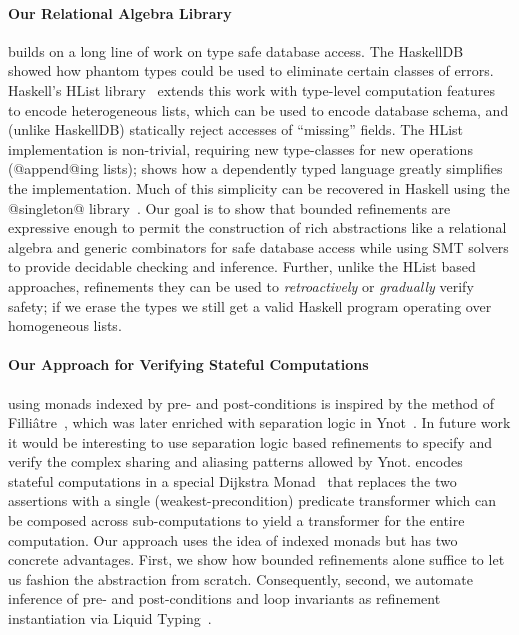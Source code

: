 \paragraph{Our Relational Algebra Library} builds on a long
line of work on type safe database access.
%
The HaskellDB~\citep{haskellDB}
showed how phantom types could be used to eliminate
certain classes of errors.
%
Haskell's HList library~\citep{heterogeneous}
extends this work with type-level computation
features to encode heterogeneous lists, which
can be used to encode database schema, and
(unlike HaskellDB) statically reject accesses
of ``missing'' fields.
%
The HList implementation is non-trivial,
requiring new type-classes for new operations
(\eg @append@ing lists); \citep{thepipower}
shows how a dependently typed language greatly
simplifies the implementation.
%
Much of this simplicity can be recovered in
Haskell using the @singleton@ library~\citep{Weirich12}.
%
Our goal is to show that bounded refinements
are expressive enough to permit the construction
of rich abstractions like a relational algebra
and generic combinators for safe database access
while using SMT solvers to provide decidable
checking and inference. Further, unlike the
HList based approaches, refinements they can
be used to \emph{retroactively} or \emph{gradually}
verify safety; if we erase the types we still
get a valid Haskell program operating over
homogeneous lists.


\paragraph{Our Approach for Verifying Stateful Computations} using monads
indexed by pre- and post-conditions is inspired by the method of
Filli\^atre~\citep{Filliatre98}, which was later enriched with
separation logic in Ynot~\citep{ynot}. In future work it would
be interesting to use separation logic based refinements to specify
and verify the complex sharing and aliasing patterns allowed by Ynot.
%
\fstar encodes stateful computations in a special Dijkstra
Monad~\citep{dijkstramonad} that replaces the two assertions with
a single (weakest-precondition) predicate transformer which
can be composed across sub-computations to yield a transformer
for the entire computation.
%
Our \RIO approach uses the idea of indexed monads but
has two concrete advantages.
%
First, we show how bounded refinements alone suffice to
let us fashion the \RIO abstraction from scratch.
%
Consequently, second, we automate inference of pre- and
post-conditions and loop invariants as refinement instantiation
via Liquid Typing~\citep{LiquidPLDI08}.
